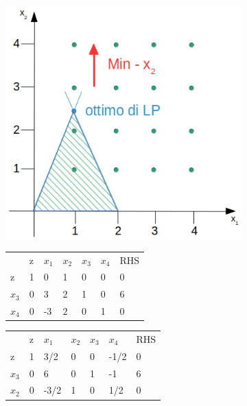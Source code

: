 \centerline{\includegraphics[height=9cm]{images/graph12.png}}

\begin{table}[h]
	\centering
	\begin{tabular}{lllllll}
				&                       z & $x_{1}$ & $x_{2}$  & $x_{3}$ & $x_{4}$ &  RHS  \\ \cline{2-7}
			z	& \multicolumn{1}{|l|}{1} & 0       & 1        & 0       & 0       & \multicolumn{1}{|l|}{0} \\ \cline{2-7}
		$x_{3}$ & \multicolumn{1}{|l|}{0} & 3       & 2        & 1       & 0	   & \multicolumn{1}{|l|}{6} \\
		$x_{4}$ & \multicolumn{1}{|l|}{0} & -3      & {\LARGE \textcircled{\normalsize $2$}}        & 0       & 1       & \multicolumn{1}{|l|}{0} \\ \cline{2-7}
	\end{tabular}
\end{table}

\begin{table}[!h]
	\centering
	\begin{tabular}{lllllll}
		        &                       z & $x_{1}$ & $x_{2}$  & $x_{3}$ & $x_{4}$ &  RHS  \\ \cline{2-7}
		      z & \multicolumn{1}{|l|}{1} & 3/2     & 0        & 0       & -1/2    & \multicolumn{1}{|l|}{0} \\ \cline{2-7}
		$x_{3}$ & \multicolumn{1}{|l|}{0} & {\LARGE \textcircled{\normalsize $6$}}   & 0       & 1 & -1  & \multicolumn{1}{|l|}{6} \\
		$x_{2}$ & \multicolumn{1}{|l|}{0} & -3/2    & 1        & 0       & 1/2     & \multicolumn{1}{|l|}{0} \\ \cline{2-7}
	\end{tabular}
\end{table}

